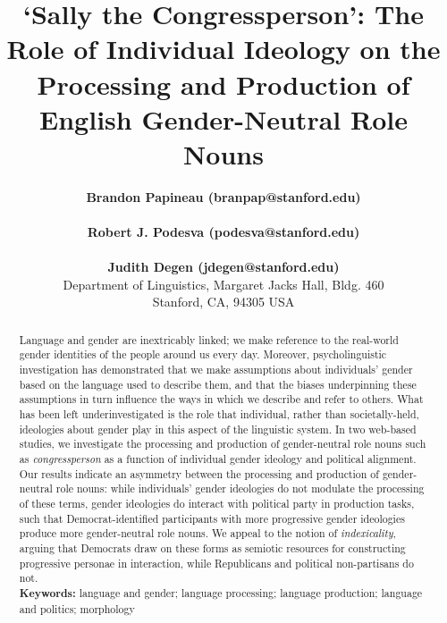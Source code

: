 \documentclass[10pt,letterpaper]{article}
\title{`Sally the Congressperson': The Role of Individual Ideology on the Processing and Production of English Gender-Neutral Role Nouns}
\author{{\large \bf Brandon Papineau (branpap@stanford.edu)} \\\\
{\large \bf Robert J. Podesva (podesva@stanford.edu)} \\\\
{\large \bf Judith Degen (jdegen@stanford.edu)} \\
Department of Linguistics, Margaret Jacks Hall, Bldg. 460\\
Stanford, CA, 94305 USA}
\begin{document}
	
	\maketitle
	
	\begin{abstract} 
		Language and gender are inextricably linked; we make reference to the real-world gender identities of the people around us every day. Moreover, psycholinguistic investigation has demonstrated that we make assumptions about individuals' gender based on the language used to describe them, and that the biases underpinning these assumptions in turn influence the ways in which we describe and refer to others. What has been left underinvestigated is the role that individual, rather than societally-held, ideologies about gender play in this aspect of the linguistic system. In two web-based studies, we investigate the processing and production of gender-neutral role nouns such as \textit{congressperson} as a function of individual gender ideology and political alignment. Our results indicate an asymmetry between the processing and production of gender-neutral role nouns: while individuals' gender ideologies do not modulate the processing of these terms, gender ideologies do interact with political party in production tasks, such that Democrat-identified participants with more progressive gender ideologies produce more gender-neutral role nouns. We appeal to the notion of \textit{indexicality}, arguing that Democrats draw on these forms as semiotic resources for constructing progressive personae in interaction, while Republicans and political non-partisans do not.\\
		\linebreak
		\textbf{Keywords:} 
		language and gender; language processing; language production; language and politics; morphology
	\end{abstract}
	
	
\end{document}
